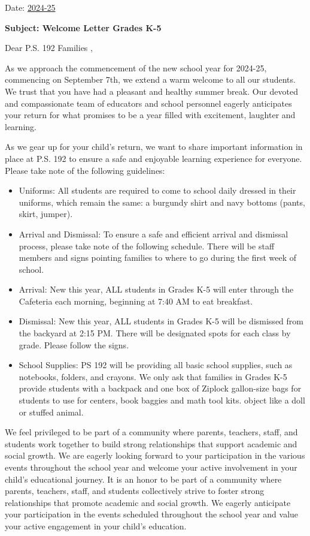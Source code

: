 \documentclass[12pt,letterpaper]{article}
\begin{document}
\vspace*{0.5in}
Date: \href{https://www.ps192.org}{2024-25} 

\textbf{Subject: Welcome Letter Grades K-5}

Dear P.S. 192 Families ,

As we approach the commencement of the new school year for 2024-25, commencing on 
September 7th, we extend a warm welcome to all our students. We trust that you have had a
pleasant and healthy summer break. Our devoted and compassionate team of educators and
school personnel eagerly anticipates your return for what promises to be a year filled
with excitement, laughter and learning.

As we gear up for your child's return, we want to share important information in place at
P.S. 192 to ensure a safe and enjoyable learning experience for everyone. Please take note
of the following guidelines:
	\begin{itemize}
	\item Uniforms: All students are required to come to school daily dressed in their
	uniforms, which remain the same: a burgundy shirt and navy bottoms (pants, skirt, 
	jumper).
	\item Arrival and Dismissal: To ensure a safe and efficient arrival and dismissal 
	process, please take note of the following schedule. There will be staff members and 
	signs pointing families to where to go during the first week of school.
	\item Arrival: New this year, ALL students in Grades K-5 will enter through the 
	Cafeteria each morning, beginning at 7:40 AM to eat breakfast.
	\item Dismissal: New this year, ALL students in Grades K-5 will be dismissed from the
	backyard at 2:15 PM. There will be designated spots for each class by grade. Please
	follow the signs.
	\item School Supplies: PS 192 will be providing all basic school supplies, such as
	notebooks, folders, and crayons. We only ask that families in Grades K-5 provide
	students with a backpack and one box of Ziplock gallon-size bags for students to use
	for centers, book baggies and math tool kits. object like a doll or stuffed animal.
	\end{itemize}

We feel privileged to be part of a community where parents, teachers, staff, and students
work together to build strong relationships that support academic and social growth. We
are eagerly looking forward to your participation in the various events throughout the
school year and welcome your active involvement in your child's educational journey.
\pagebreak
\vspace*{2cm}
It is an honor to be part of a community where parents, teachers, staff, and students
collectively strive to foster strong relationships that promote academic and social growth. We eagerly anticipate your participation in the events scheduled throughout the
school year and value your active engagement in your child's education.
\end{document}
